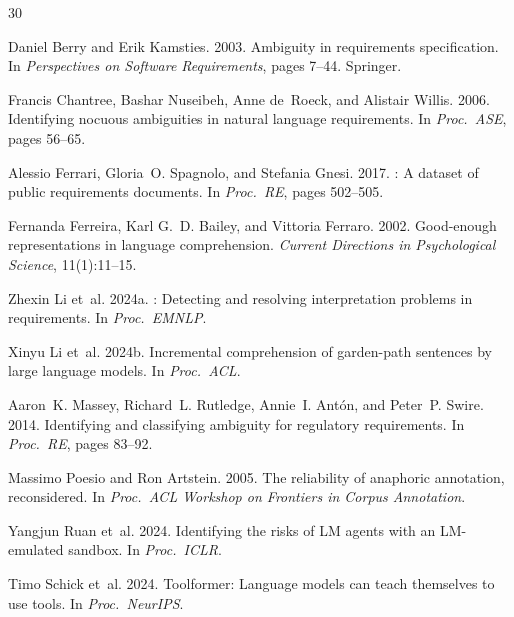 \documentclass[11pt]{article}
\begin{document}
\begin{thebibliography}{30}

Daniel Berry and Erik Kamsties. 2003.
\newblock Ambiguity in requirements specification.
\newblock In \emph{Perspectives on Software Requirements}, pages 7--44. Springer.

Francis Chantree, Bashar Nuseibeh, Anne de~Roeck, and Alistair Willis. 2006.
\newblock Identifying nocuous ambiguities in natural language requirements.
\newblock In \emph{Proc.\ ASE}, pages 56--65.

Alessio Ferrari, Gloria~O. Spagnolo, and Stefania Gnesi. 2017.
: A dataset of public requirements documents.
\newblock In \emph{Proc.\ RE}, pages 502--505.

Fernanda Ferreira, Karl G.~D. Bailey, and Vittoria Ferraro. 2002.
\newblock Good-enough representations in language comprehension.
\newblock \emph{Current Directions in Psychological Science}, 11(1):11--15.

Zhexin Li et~al. 2024a.
: Detecting and resolving interpretation problems in requirements.
\newblock In \emph{Proc.\ EMNLP}.

Xinyu Li et~al. 2024b.
\newblock Incremental comprehension of garden-path sentences by large language models.
\newblock In \emph{Proc.\ ACL}.

Aaron~K. Massey, Richard~L. Rutledge, Annie~I. Ant\'{o}n, and Peter~P. Swire. 2014.
\newblock Identifying and classifying ambiguity for regulatory requirements.
\newblock In \emph{Proc.\ RE}, pages 83--92.

Massimo Poesio and Ron Artstein. 2005.
\newblock The reliability of anaphoric annotation, reconsidered.
\newblock In \emph{Proc.\ ACL Workshop on Frontiers in Corpus Annotation}.

Yangjun Ruan et~al. 2024.
\newblock Identifying the risks of {LM} agents with an {LM}-emulated sandbox.
\newblock In \emph{Proc.\ ICLR}.

Timo Schick et~al. 2024.
\newblock Toolformer: Language models can teach themselves to use tools.
\newblock In \emph{Proc.\ NeurIPS}.


\end{thebibliography}
\end{document}
